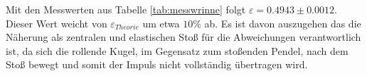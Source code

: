 Mit den Messwerten aus Tabelle \ref{tab:messwrinne} folgt $\varepsilon = 0.4943 \pm 0.0012$. Dieser Wert weicht von $\varepsilon_{Theorie}$ um etwa $10\%$ ab. Es ist davon auszugehen das die Näherung als zentralen und elastischen Stoß für die Abweichungen verantwortlich ist, da sich die rollende Kugel, im Gegensatz zum stoßenden Pendel, nach dem Stoß bewegt und somit der Impuls nicht vollständig übertragen wird. 














